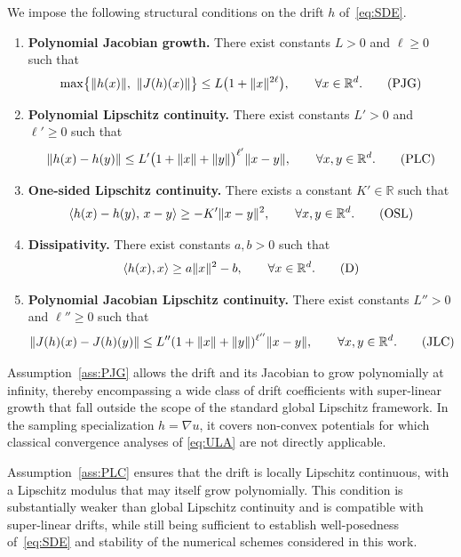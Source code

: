 \documentclass[11pt,a4paper,reqno]{amsart}
\theoremstyle{plain}
\theoremstyle{definition}
\theoremstyle{remark}
\begin{document}
We impose the following structural conditions on the drift $h$ of~\eqref{eq:SDE}.

\begin{enumerate}[label=(A\arabic*), leftmargin=*]

\item \textbf{Polynomial Jacobian growth.}\label{ass:PJG}
There exist constants $L>0$ and $\ell\ge0$ such that
\[
  \max\bigl\{\|h(x)\|,\ \|J(h)(x)\|\bigr\}
  \le L\bigl(1+\|x\|^{2\ell}\bigr),
  \qquad \forall x\in\mathbb{R}^d.
  \tag*{\textup{(PJG)}}
\]

\item \textbf{Polynomial Lipschitz continuity.}\label{ass:PLC}
There exist constants $L'>0$ and $\ell'\ge0$ such that
\[
  \|h(x)-h(y)\|
  \le
  L'\bigl(1+\|x\|+\|y\|\bigr)^{\ell'}\|x-y\|,
  \qquad \forall x,y\in\mathbb{R}^d.
  \tag*{\textup{(PLC)}}
\]

\item \textbf{One-sided Lipschitz continuity.}\label{ass:OSL}
There exists a constant $K'\in\mathbb{R}$ such that
\[
  \langle h(x)-h(y),\,x-y\rangle
  \ge -K'\|x-y\|^2,
  \qquad \forall x,y\in\mathbb{R}^d.
  \tag*{\textup{(OSL)}}
\]

\item \textbf{Dissipativity.}\label{ass:D}
There exist constants $a,b>0$ such that
\[
  \langle h(x),x\rangle \ge a\|x\|^2 - b,
  \qquad \forall x\in\mathbb{R}^d.
  \tag*{\textup{(D)}}
\]
\item \textbf{Polynomial Jacobian Lipschitz continuity.}\label{ass:JLC}
There exist constants $L''>0$ and $\ell''\ge0$ such that
\[
  \|J(h)(x)-J(h)(y)\|
  \le
  L''(1+\|x\|+\|y\|)^{\ell''}\|x-y\|,
  \qquad \forall x,y\in\mathbb{R}^d.
  \tag*{\textup{(JLC)}}
\]
\end{enumerate}

Assumption~\ref{ass:PJG} allows the drift and its Jacobian to grow polynomially at infinity, thereby encompassing a wide class of drift coefficients with super-linear growth that fall outside the scope of the standard global Lipschitz framework. In the sampling specialization $h = \nabla u$, it covers non-convex potentials for which classical convergence analyses of \eqref{eq:ULA} are not directly applicable.

Assumption~\ref{ass:PLC} ensures that the drift is locally Lipschitz continuous,
with a Lipschitz modulus that may itself grow polynomially.
This condition is substantially weaker than global Lipschitz continuity
and is compatible with super-linear drifts,
while still being sufficient to establish well-posedness of~\eqref{eq:SDE}
and stability of the numerical schemes considered in this work.
\end{document}
